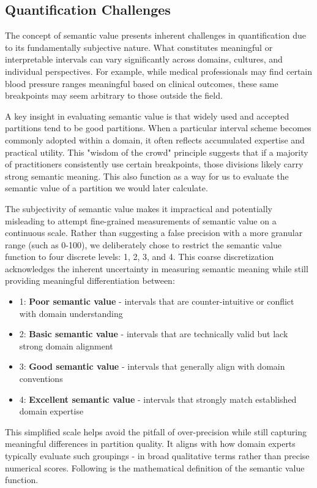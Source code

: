 \documentclass{article}
\begin{document}
\subsection*{Quantification Challenges}

The concept of semantic value presents inherent challenges in quantification due to its fundamentally subjective nature. What constitutes meaningful or interpretable intervals can vary significantly across domains, cultures, and individual perspectives. For example, while medical professionals may find certain blood pressure ranges meaningful based on clinical outcomes, these same breakpoints may seem arbitrary to those outside the field.

A key insight in evaluating semantic value is that widely used and accepted partitions tend to be good partitions. When a particular interval scheme becomes commonly adopted within a domain, it often reflects accumulated expertise and practical utility. This "wisdom of the crowd" principle suggests that if a majority of practitioners consistently use certain breakpoints, those divisions likely carry strong semantic meaning. This also function as a way for us to evaluate the semantic value of a partition we would later calculate.

The subjectivity of semantic value makes it impractical and potentially misleading to attempt fine-grained measurements of semantic value on a continuous scale. Rather than suggesting a false precision with a more granular range (such as 0-100), we deliberately chose to restrict the semantic value function to four discrete levels: 1, 2, 3, and 4. This coarse discretization acknowledges the inherent uncertainty in measuring semantic meaning while still providing meaningful differentiation between:

\begin{itemize}
    \item 1: \textbf{Poor semantic value} - intervals that are counter-intuitive or conflict with domain understanding
    \item 2: \textbf{Basic semantic value} - intervals that are technically valid but lack strong domain alignment
    \item 3: \textbf{Good semantic value} - intervals that generally align with domain conventions
    \item 4: \textbf{Excellent semantic value} - intervals that strongly match established domain expertise
\end{itemize}

This simplified scale helps avoid the pitfall of over-precision while still capturing meaningful differences in partition quality. It aligns with how domain experts typically evaluate such groupings - in broad qualitative terms rather than precise numerical scores.
Following is the mathematical definition of the semantic value function.
\end{document}
